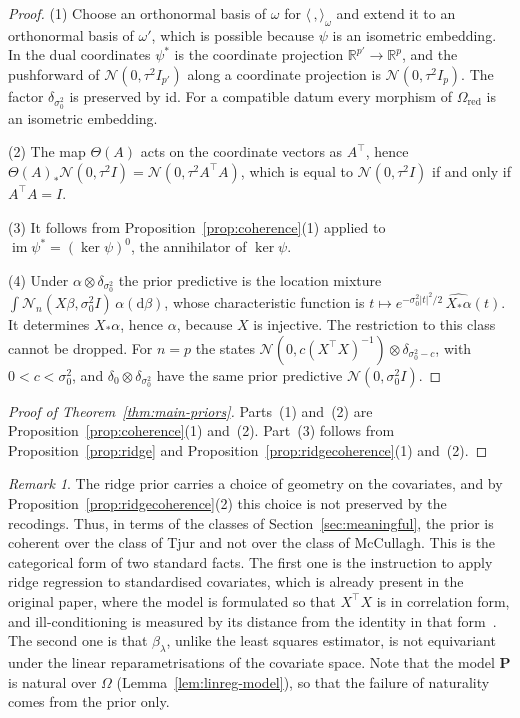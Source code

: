 \documentclass[11pt,a4paper]{article}
\theoremstyle{plain}
\theoremstyle{definition}
\theoremstyle{remark}
\newtheorem{remark}[theorem]{Remark}
\newcommand{\cat}[1]{\mathsf{#1}}
\newcommand{\catO}{\cat{\Omega}}
\newcommand{\id}{\mathrm{id}}
\newcommand{\R}{\mathbb{R}}
\newcommand{\Norm}{\mathcal{N}}
\begin{document}
\begin{proof}
(1) Choose an orthonormal basis of $\omega$ for
$\langle\,,\rangle_{\omega}$ and extend it to an orthonormal basis of
$\omega'$, which is possible because $\psi$ is an isometric embedding. In the
dual coordinates $\psi^{*}$ is the coordinate projection
$\R^{p'} \to \R^{p}$, and the pushforward of $\Norm(0,\tau^{2}I_{p'})$ along a
coordinate projection is $\Norm(0,\tau^{2}I_{p})$. The factor
$\delta_{\sigma_{0}^{2}}$ is preserved by $\id$. For a compatible datum every
morphism of $\catO_{\mathrm{red}}$ is an isometric embedding.

(2) The map $\Theta(A)$ acts on the coordinate vectors as $A^{\!\top}$, hence
$\Theta(A)_{*}\Norm(0,\tau^{2}I) = \Norm(0,\tau^{2}A^{\!\top}A)$, which is
equal to $\Norm(0,\tau^{2}I)$ if and only if $A^{\!\top}A = I$.

(3) It follows from Proposition~\ref{prop:coherence}(1) applied to
$\operatorname{im}\psi^{*} = (\ker\psi)^{0}$, the annihilator of $\ker\psi$.

(4) Under $\alpha\otimes\delta_{\sigma_{0}^{2}}$ the prior predictive is the
location mixture
$\int \Norm_{n}(X\beta,\sigma_{0}^{2}I)\,\alpha(\mathrm{d}\beta)$, whose
characteristic function is
$t \mapsto e^{-\sigma_{0}^{2}|t|^{2}/2}\,\widehat{X_{*}\alpha}(t)$. It
determines $X_{*}\alpha$, hence $\alpha$, because $X$ is injective. The
restriction to this class cannot be dropped. For $n = p$ the states
$\Norm(0,c(X^{\!\top}X)^{-1})\otimes\delta_{\sigma_{0}^{2}-c}$, with
$0 < c < \sigma_{0}^{2}$, and $\delta_{0}\otimes\delta_{\sigma_{0}^{2}}$ have
the same prior predictive $\Norm(0,\sigma_{0}^{2}I)$.
\end{proof}

\begin{proof}[Proof of Theorem~\ref{thm:main-priors}]
Parts~(1) and~(2) are Proposition~\ref{prop:coherence}(1) and~(2). Part~(3)
follows from Proposition~\ref{prop:ridge} and
Proposition~\ref{prop:ridgecoherence}(1) and~(2).
\end{proof}

\begin{remark}\label{rem:standardise}
The ridge prior carries a choice of geometry on the covariates, and by
Proposition~\ref{prop:ridgecoherence}(2) this choice is not preserved by the
recodings. Thus, in terms of the classes of Section~\ref{sec:meaningful}, the
prior is coherent over the class of Tjur and not over the class of McCullagh.
This is the categorical form of two standard facts. The first one is the
instruction to apply ridge regression to standardised covariates, which is
already present in the original paper, where the model is formulated so that
$X^{\!\top}X$ is in correlation form, and ill-conditioning is measured by its
distance from the identity in that
form~\cite[pp.~55--56]{hoerl_ridge_1970}. The second one is that
$\widehat\beta_{\lambda}$, unlike the least squares estimator, is not
equivariant under the linear reparametrisations of the covariate space. Note
that the model $\mathbf{P}$ is natural over $\catO$
(Lemma~\ref{lem:linreg-model}), so that the failure of naturality comes from
the prior only.
\end{remark}
\end{document}
